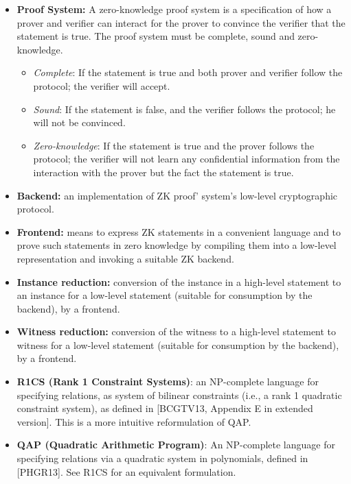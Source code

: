 \begin{itemize}[leftmargin=1em]
    \item \textbf{Proof System:} A zero-knowledge proof system is a specification of how a prover and verifier can interact for the prover to convince the verifier that the statement is true. The proof system must be complete, sound and zero-knowledge.
			\begin{itemize}[leftmargin=1em]
				\item \emph{Complete}: If the statement is true and both prover and verifier follow the protocol; the verifier will accept.
				\item \emph{Sound}: If the statement is false, and the verifier follows the protocol; he will not be convinced.
				\item \emph{Zero-knowledge}: If the statement is true and the prover follows the protocol; the verifier will not learn any confidential information from the interaction with the prover but the fact the statement is true.
			\end{itemize}


    \item \textbf{Backend:} an implementation of ZK proof’ system’s low-level cryptographic protocol.
    \item \textbf{Frontend:} means to express ZK statements in a convenient language and to prove such statements in zero knowledge by compiling them into a low-level representation and invoking a suitable ZK backend.
    \item \textbf{Instance reduction:} conversion of the instance in a high-level statement to an instance for a low-level statement (suitable for consumption by the backend), by a frontend.
    \item \textbf{Witness reduction:} conversion of the witness to a high-level statement to witness for a low-level statement (suitable for consumption by the backend), by a frontend.
    \item \textbf{R1CS (Rank 1 Constraint Systems)}: an NP-complete language for specifying relations, as system of bilinear constraints (i.e., a rank 1 quadratic constraint system), as defined in [BCGTV13, Appendix E in extended version]. This is a more intuitive reformulation of QAP.
    \item \textbf{QAP (Quadratic Arithmetic Program)}: An NP-complete language for specifying relations via a quadratic system in polynomials, defined in [PHGR13]. See R1CS for an equivalent formulation.
		\end{itemize}



